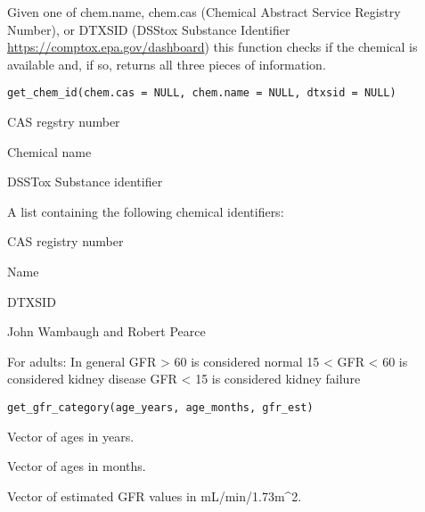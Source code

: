 \documentclass[a4paper]{book}
\begin{document}
%
\begin{Description}\relax
Given one of chem.name, chem.cas (Chemical Abstract Service Registry Number),
or DTXSID (DSStox Substance Identifier \url{https://comptox.epa.gov/dashboard}) this
function checks if the chemical is available and, if so, returns all three
pieces of information.
\end{Description}
%
\begin{Usage}
\begin{verbatim}
get_chem_id(chem.cas = NULL, chem.name = NULL, dtxsid = NULL)
\end{verbatim}
\end{Usage}
%
\begin{Arguments}
\begin{ldescription}
\item[\code{chem.cas}] CAS regstry number

\item[\code{chem.name}] Chemical name

\item[\code{dtxsid}] DSSTox Substance identifier
\end{ldescription}
\end{Arguments}
%
\begin{Value}
A list containing the following chemical identifiers:
\begin{ldescription}
\item[\code{chem.cas}] CAS registry number
\item[\code{chem.name}] Name
\item[\code{dtxsid}] DTXSID
\end{ldescription}
\end{Value}
%
\begin{Author}\relax
John Wambaugh and Robert Pearce
\end{Author}
%
\begin{Description}\relax
For adults: 
In general GFR > 60 is considered normal 
15 < GFR < 60 is considered kidney disease 
GFR < 15 is considered kidney failure
\end{Description}
%
\begin{Usage}
\begin{verbatim}
get_gfr_category(age_years, age_months, gfr_est)
\end{verbatim}
\end{Usage}
%
\begin{Arguments}
\begin{ldescription}
\item[\code{age\_years}] Vector of ages in years.

\item[\code{age\_months}] Vector of ages in months.

\item[\code{gfr\_est}] Vector of estimated GFR values in mL/min/1.73m\textasciicircum{}2.
\end{ldescription}
\end{Arguments}
\end{document}
